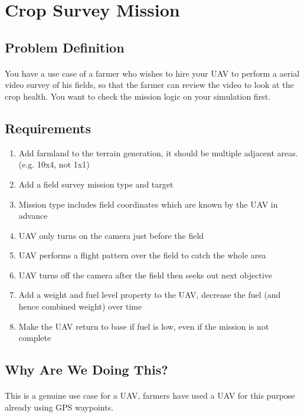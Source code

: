 \documentclass[11pt]{book}
\begin{document}
\clearpage


\section{Crop Survey Mission}

\subsection{Problem Definition}

\paragraph{} You have a use case of a farmer who wishes to hire your UAV to perform a aerial video survey of his fields, so that the farmer can review the video to look at the crop health. You want to check the mission logic on your simulation first.

\subsection{Requirements}

\begin{enumerate}
\item Add farmland to the terrain generation, it should be multiple adjacent areas. (e.g. 10x4, not 1x1)
\item Add a field survey mission type and target
\item Mission type includes field coordinates which are known by the UAV in advance
\item UAV only turns on the camera just before the field
\item UAV performs a flight pattern over the field to catch the whole area
\item UAV turns off the camera after the field then seeks out next objective
\item Add a weight and fuel level property to the UAV, decrease the fuel (and hence combined weight) over time
\item Make the UAV return to base if fuel is low, even if the mission is not complete
\end{enumerate}

\subsection{Why Are We Doing This?}

\paragraph{} This is a genuine use case for a UAV, farmers have used a UAV for this purpose already using GPS waypoints.
\end{document}
